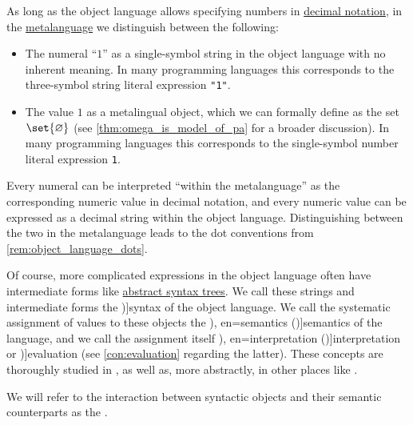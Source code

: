 \begin{concept}\label{con:syntax_semantics_duality}
  As long as the object language allows specifying numbers in \hyperref[def:positional_number_system/decimal]{decimal notation}, in the \hyperref[con:metalanguage]{metalanguage} we distinguish between the following:
  \begin{itemize}
    \item The numeral \enquote{\( 1 \)} as a single-symbol string in the object language with no inherent meaning. In many programming languages this corresponds to the three-symbol string literal expression \texttt{"1"}.

    \item The value \( 1 \) as a metalingual object, which we can formally define as the set \( \set{ \varnothing } \) (see \cref{thm:omega_is_model_of_pa} for a broader discussion). In many programming languages this corresponds to the single-symbol number literal expression \texttt{1}.
  \end{itemize}

  Every numeral can be interpreted \enquote{within the metalanguage} as the corresponding numeric value in decimal notation, and every numeric value can be expressed as a decimal string within the object language. Distinguishing between the two in the metalanguage leads to the dot conventions from \cref{rem:object_language_dots}.

  Of course, more complicated expressions in the object language often have intermediate forms like \hyperref[con:abstract_syntax_tree]{abstract syntax trees}. We call these strings and intermediate forms the \term[en=syntax (\cite[8]{Hinman2005Logic})]{syntax} of the object language. We call the systematic assignment of values to these objects the \term[ru=семантика (\cite[54]{КолмогоровДрагалин2006Логика}), en=semantics (\cite[8]{Hinman2005Logic})]{semantics} of the language, and we call the assignment itself \term[ru=интерпретация (\cite[17]{Герасимов2011Вычислимость}), en=interpretation (\cite[10]{Smullyan1995FOL})]{interpretation} or \term[ru=оценка (\cite[77]{ШеньВерещагин2017ЯзыкиИИсчисления})]{evaluation} (see \cref{con:evaluation} regarding the latter). These concepts are thoroughly studied in , as well as, more abstractly, in other places like .

  We will refer to the interaction between syntactic objects and their semantic counterparts as the .
\end{concept}


